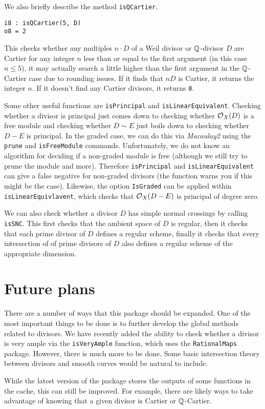 \documentclass[11pt]{amsart}
\begin{document}
We also briefly describe the method {\tt isQCartier}.
\begin{verbatim}
i8 : isQCartier(5, D)
o8 = 2
\end{verbatim}
This checks whether any multiples $n \cdot D$ of a Weil divisor or $\mathbb{Q}$-divisor $D$ are Cartier for any integer $n$ less than or equal to the first argument (in this case $n \leq 5$), it may actually search a little higher than the first argument in the $\mathbb{Q}$-Cartier case due to rounding issues.  If it finds that $nD$ is Cartier, it returns the integer $n$.  If it doesn't find any Cartier divisors, it returns {\tt 0}.

Some other useful functions are {\tt isPrincipal} and {\tt isLinearEquivalent}.  Checking whether a divisor is principal just comes down to checking whether $\mbox{$\mathcal{O}$}_X(D)$ is a free module and checking whether $D \sim E$ just boils down to checking whether $D-E$ is principal.  In the graded case, we can do this via \emph{Macaulay2} using the {\tt prune} and {\tt isFreeModule} commands. Unfortunately, we do not know an algorithm for deciding if a non-graded module is free (although we still try to prune the module and more).  Therefore {\tt isPrincipal} and {\tt isLinearEquivalent} can give a false negative for non-graded divisors (the function warns you if this might be the case).  Likewise, the option {\tt IsGraded} can be applied within {\tt isLinearEquivlavent}, which checks that $\mbox{$\mathcal{O}$}_X(D-E)$ is principal of degree zero.

We can also check whether a divisor $D$ has simple normal crossings by calling {\tt isSNC}.  This first checks that the ambient space of $D$ is regular, then it checks that each prime divisor of $D$  defines a regular scheme, finally it checks that every intersection of of prime divisors of $D$ also defines a regular scheme of the appropriate dimension.

\section{Future plans}
\label{sec.Plans}

There are a number of ways that this package should be expanded.  One of the most important things to be done is to further develop the global methods related to divisors.  We have recently added the ability to check whether a divisor is very ample via the {\tt isVeryAmple} function, which uses the {\tt RationalMaps} package.  However, there is much more to be done.  Some basic intersection theory between divisors and smooth curves would be natural to include.

While the latest version of the package stores the outputs of some functions in the cache, this can still be improved.  For example, there are likely ways to take advantage of knowing that a given divisor is Cartier or $\mathbb{Q}$-Cartier.



\end{document}

